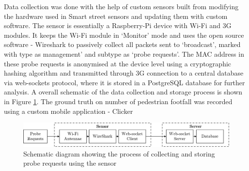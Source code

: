 Data collection was done with the help of custom sensors built from modifying the hardware used in Smart street sensors \citep{sss2016} and updating them with custom software.
The sensor is essentially a Raspberry-Pi device with Wi-Fi and 3G modules.
It keeps the Wi-Fi module in `Monitor' mode and uses the open source software - Wireshark \citep{wireshark2} to passively collect all packets sent to `broadcast', marked with type as management' and subtype as `probe requests'.
The MAC address in these probe requests is anonymised at the device level using a cryptographic hashing algorithm and transmitted through 3G connection to a central database via web-sockets protocol, where it is stored in a PostgreSQL database for further analysis.
A overall schematic of the data collection and storage process is shown in Figure \ref{datacollection_schematic}.
The ground truth on number of pedestrian footfall was recorded using a custom mobile application - Clicker \citep{bala2018clicker}

\begin{figure}
	\centering
	\includegraphics[width=\linewidth]{images/datacollection_schematic.jpeg}
	\caption{Schematic diagram showing the process of collecting and storing probe requests using the sensor} \label{datacollection_schematic}
\end{figure}

